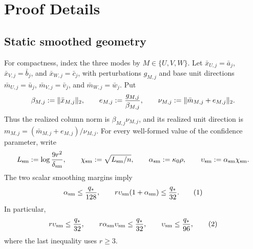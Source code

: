 \appendix

\section{Proof Details}\label{sec:proof-details}

\subsection{Static smoothed geometry}\label{app:step-001}

For compactness, index the three modes by $M\in\{U,V,W\}$. Let
$\bar x_{U,j}=\bar a_j$, $\bar x_{V,j}=\bar b_j$, and
$\bar x_{W,j}=\bar c_j$, with perturbations $g_{M,j}$ and base unit
directions $\bar m_{U,j}=\bar u_j$,
$\bar m_{V,j}=\bar v_j$, and
$\bar m_{W,j}=\bar w_j$. Put
\[
\beta_{M,j}:=\|\bar x_{M,j}\|_2,\qquad
e_{M,j}:={g_{M,j}\over\beta_{M,j}},\qquad
\nu_{M,j}:=\|\bar m_{M,j}+e_{M,j}\|_2.
\]
Thus the realized column norm is $\beta_{M,j}\nu_{M,j}$, and its
realized unit direction is
$m_{M,j}=(\bar m_{M,j}+e_{M,j})/\nu_{M,j}$.
For every well-formed value of the confidence parameter, write
\[
L_{\rm sm}:=\log {9r^2\over\delta_{\rm sm}},\qquad
\chi_{\rm sm}:=\sqrt{L_{\rm sm}/n},\qquad
\alpha_{\rm sm}:=\kappa _0\rho,\qquad
\upsilon_{\rm sm}:=\alpha_{\rm sm}\chi_{\rm sm}.
\]
The two scalar smoothing margins imply
\[
\alpha_{\rm sm}\le {q_*\over128},\qquad
r\upsilon_{\rm sm}(1+\alpha_{\rm sm})\le {q_*\over32}.
\tag{1}
\]
In particular,
\[
r\upsilon_{\rm sm}\le {q_*\over32},\qquad
r\alpha_{\rm sm}\upsilon_{\rm sm}\le {q_*\over32},\qquad
\upsilon_{\rm sm}\le {q_*\over96},
\tag{2}
\]
where the last inequality uses $r\ge3$.


